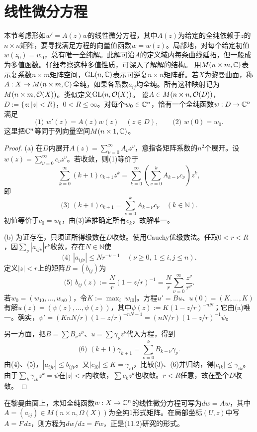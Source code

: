 \section{线性微分方程}
本节考虑形如$w'=A(z)w$的线性微分方程，其中$A(z)$为给定的全纯依赖于$z$的$n\times n$矩阵，要寻找满足方程的向量值函数$w=w(z)$。局部地，对每个给定初值$w(z_0)=w_0$，总有唯一全纯解。此解可沿$A$的定义域内每条曲线延拓，但一般成为多值函数。仔细考察这种多值性质，可深入了解解的结构。
用$M(n\times m,\mathbb C)$表示复系数$n\times m$矩阵空间，$\operatorname{GL}(n,\mathbb C)$表示可逆复$n\times n$矩阵群。若$X$为黎曼曲面，称$A:X\to M(n\times m,\mathbb C)$全纯，如果各系数$a_{ij}$均全纯。所有这种映射记为$M(n\times m,\mathcal O(X))$。类似定义$\operatorname{GL}(n,\mathcal O(X))$。
设$A\in M(n\times n,\mathcal O(D))$，$D:=\{z:|z|<R\}$，$0<R\le\infty$。对每个$w_0\in\mathbb C^n$，恰有一个全纯函数$w:D\to\mathbb C^n$满足
\[
\text{(1) }w'(z)=A(z)w(z)\quad(z\in D),\qquad\text{(2) }w(0)=w_0.
\]
这里把$\mathbb C^n$等同于列向量空间$M(n\times1,\mathbb C)$。
\begin{proof}
(a) 在$D$内展开$A(z)=\sum_{\nu=0}^\infty A_\nu z^\nu$，意指各矩阵系数的$n^2$个展开。设$w(z)=\sum_{\nu=0}^\infty c_\nu z^\nu$。若收敛，则(1)等价于
\[
\sum_{k=0}^\infty(k+1)c_{k+1}z^k=\sum_{k=0}^\infty\left(\sum_{\nu=0}^kA_{k-\nu}c_\nu\right)z^k,
\]
即
\[
\text{(3) }(k+1)c_{k+1}=\sum_{\nu=0}^kA_{k-\nu}c_\nu\quad(k\in\mathbb N).
\]
初值等价于$c_0=w_0$，由(3)递推确定所有$c_k$，故解唯一。

(b) 为证存在，只须证所得级数在$D$收敛。使用Cauchy优级数法。任取$0<r<R$，因$\sum_\nu|a_{ij\nu}|r^\nu$收敛，存在$N\in\mathbb N$使
\[
\text{(4) }|a_{ij\nu}|\le Nr^{-\nu-1}\quad(\nu\ge0,\ 1\le i,j\le n).
\]
定义$|z|<r$上的矩阵$B=(b_{ij})$为
\[
\text{(5) }b_{ij}(z):=\frac Nr(1-z/r)^{-1}=\frac Nr\sum_{\nu=0}^\infty\frac{z^\nu}{r^\nu}.
\]
若$w_0=(w_{10},\ldots,w_{n0})$，令$K:=\max_i|w_{i0}|$。方程$u'=Bu$、$u(0)=(K,\ldots,K)$有解$u(z)=(\psi(z),\ldots,\psi(z))$，其中$\psi(z):=K(1-z/r)^{-nN}$；它由(a)唯一。确实，$\psi'=(KnN/r)(1-z/r)^{-nN-1}=(nN/r)(1-z/r)^{-1}\psi$。

另一方面，把$B=\sum B_\nu z^\nu$、$u=\sum\gamma_\nu z^\nu$代入方程，得到
\[
\text{(6) }(k+1)\gamma_{k+1}=\sum_{\nu=0}^kB_{k-\nu}\gamma_\nu.
\]
由(4)、(5)，$|a_{ij\nu}|\le b_{ij\nu}$。又$|c_{i0}|\le K=\gamma_{i0}$，比较(3)、(6)并归纳，得$|c_{ik}|\le\gamma_{ik}$。由于$\sum_k\gamma_{ik}z^k=\psi$在$|z|<r$内收敛，$\sum c_kz^k$也收敛。$r<R$任意，故在整个$D$收敛。
\end{proof}
在黎曼曲面上，未知全纯函数$w:X\to\mathbb C^n$的线性微分方程可写为$dw=Aw$，其中$A=(a_{ij})\in M(n\times n,\Omega(X))$为全纯1形式矩阵。在局部坐标$(U,z)$中写$A=F\,dz$，则方程为$dw/dz=Fw$，正是(11.2)研究的形式。
